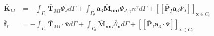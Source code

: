\begin{subequations}\label{de3}
\begin{align}
\bar{\boldsymbol K}_{IJ} &= - \int_{\Gamma_v} \bar{\boldsymbol T}_{MI} \Psi_J d\Gamma 
+ \int_{\Gamma_\theta} \boldsymbol a_3\bar{\boldsymbol M}_{\boldsymbol{nn}I} \Psi_{J,\gamma}n^\gamma d\Gamma + [[\bar{\boldsymbol P}_I \boldsymbol a_3 \Psi_J]]_{\boldsymbol x \in C_v} \\
\bar{\boldsymbol f}_I &= - \int_{\Gamma_v} \bar{\boldsymbol T}_{MI} \cdot \bar{\boldsymbol v} d\Gamma + \int_{\Gamma_\theta} \bar{\boldsymbol M}_{\boldsymbol{nn} I} \bar{\theta}_{\boldsymbol n} d\Gamma + [[\bar{\boldsymbol P}_I\boldsymbol a_3 \cdot \bar{\boldsymbol v}]]_{\boldsymbol x \in C_v}
\end{align}
\end{subequations}

